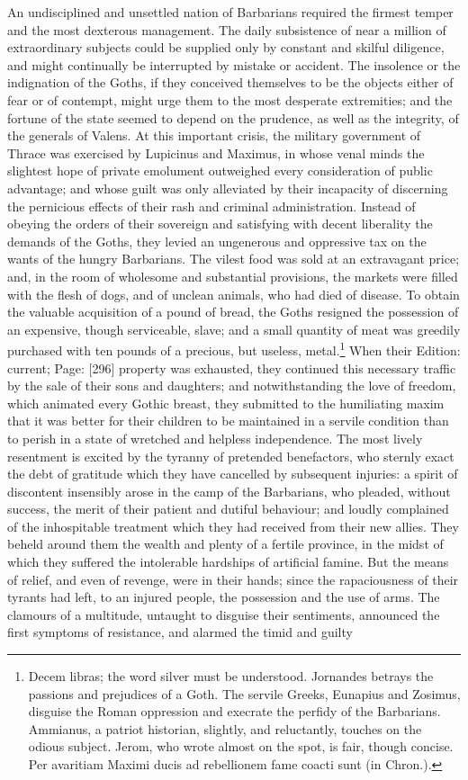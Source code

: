 An undisciplined and unsettled nation of Barbarians required the firmest temper and the most dexterous management. The daily subsistence of near a million of extraordinary subjects could be supplied only by constant and skilful diligence, and might continually be interrupted by mistake or accident. The insolence or the indignation of the Goths, if they conceived themselves to be the objects either of fear or of contempt, might urge them to the most desperate extremities; and the fortune of the state seemed to depend on the prudence, as well as the integrity, of the generals of Valens. At this important crisis, the military government of Thrace was exercised by Lupicinus and Maximus, in whose venal minds the slightest hope of private emolument outweighed every consideration of public advantage; and whose guilt was only alleviated by their incapacity of discerning the pernicious effects of their rash and criminal administration. Instead of obeying the orders of their sovereign and satisfying with decent liberality the demands of the Goths, they levied an ungenerous and oppressive tax on the wants of the hungry Barbarians. The vilest food was sold at an extravagant price; and, in the room of wholesome and substantial provisions, the markets were filled with the flesh of dogs, and of unclean animals, who had died of disease. To obtain the valuable acquisition of a pound of bread, the Goths resigned the possession of an expensive, though serviceable, slave; and a small quantity of meat was greedily purchased with ten pounds of a precious, but useless, metal.\footnote{Decem libras; the word silver must be understood. Jornandes betrays the passions and prejudices of a Goth. The servile Greeks, Eunapius and Zosimus, disguise the Roman oppression and execrate the perfidy of the Barbarians. Ammianus, a patriot historian, slightly, and reluctantly, touches on the odious subject. Jerom, who wrote almost on the spot, is fair, though concise. Per avaritiam Maximi ducis ad rebellionem fame coacti sunt (in Chron.).} When their Edition: current; Page: [296] property was exhausted, they continued this necessary traffic by the sale of their sons and daughters; and notwithstanding the love of freedom, which animated every Gothic breast, they submitted to the humiliating maxim that it was better for their children to be maintained in a servile condition than to perish in a state of wretched and helpless independence. The most lively resentment is excited by the tyranny of pretended benefactors, who sternly exact the debt of gratitude which they have cancelled by subsequent injuries: a spirit of discontent insensibly arose in the camp of the Barbarians, who pleaded, without success, the merit of their patient and dutiful behaviour; and loudly complained of the inhospitable treatment which they had received from their new allies. They beheld around them the wealth and plenty of a fertile province, in the midst of which they suffered the intolerable hardships of artificial famine. But the means of relief, and even of revenge, were in their hands; since the rapaciousness of their tyrants had left, to an injured people, the possession and the use of arms. The clamours of a multitude, untaught to disguise their sentiments, announced the first symptoms of resistance, and alarmed the timid and guilty 